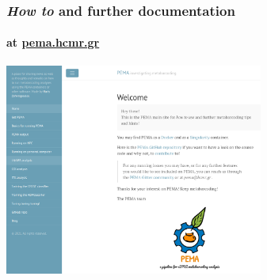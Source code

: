 \documentclass{beamer}
\begin{document}
\begin{frame}
\begin{singlespace}
\begin{textblock*}{5cm}
         \end{textblock*}


      \end{singlespace}
   \end{frame}


   \begin{frame}
      \frametitle{\textit{How to} and further documentation}
      \framesubtitle{at \href{http://pema.hcmr.gr}{pema.hcmr.gr}}
      \includegraphics[width=85mm]{resources/pema_site.png}
   \end{frame}
   \fi 
\end{document}
